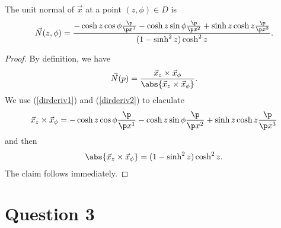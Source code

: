\documentclass{article}
\begin{document}
\begin{claim*}
   The unit normal of $\vec x$ at a point $(z,\phi)\in D$ is 
   \begin{align*}
      \vec N(z, \phi) = \frac{-\cosh z \cos\phi \frac{\p }{\p x^1}-\cosh z \sin\phi\frac{\p }{\p x^2}+\sinh z\cosh z \frac{\p }{\p x^3}}{(1-\sinh^2 z)\cosh^2 z}. 
   \end{align*} 
\end{claim*}
\begin{proof}
   By definition, we have 
   \begin{align*}
      \vec N(p) = \frac{\vec x_z \times \vec x_\phi}{\abs{\vec x_z \times \vec x_\phi}}.
   \end{align*}
   We use (\ref{dirderiv1}) and (\ref{dirderiv2}) to claculate 
   \begin{align*}
      \vec x_z\times \vec x_\phi = -\cosh z \cos\phi \frac{\p }{\p x^1}-\cosh z \sin\phi\frac{\p }{\p x^2}+\sinh z\cosh z \frac{\p }{\p x^3}
   \end{align*}
   and then 
   \begin{align*}
      \abs{\vec x_z\times \vec x_\phi} = (1-\sinh^2 z)\cosh^2 z.
   \end{align*}
   The claim follows immediately.
\end{proof}


\section*{Question 3}
\end{document}
